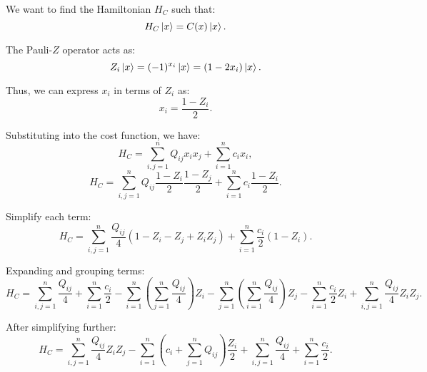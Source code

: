 \documentclass[12pt]{article}
\begin{document}
We want to find the Hamiltonian \( H_C \) such that:
\[
H_C \ket{x} = C(x) \ket{x}.
\]

The Pauli-\( Z \) operator acts as:
\[
Z_i \ket{x} = (-1)^{x_i} \ket{x} = (1 - 2x_i) \ket{x}.
\]

Thus, we can express \( x_i \) in terms of \( Z_i \) as:
\[
x_i = \frac{1 - Z_i}{2}.
\]

Substituting into the cost function, we have:
\[
H_C = \sum_{i,j=1}^n Q_{ij} x_i x_j + \sum_{i=1}^n c_i x_i,
\]
\[
H_C = \sum_{i,j=1}^n Q_{ij} \frac{1 - Z_i}{2} \frac{1 - Z_j}{2} + \sum_{i=1}^n c_i \frac{1 - Z_i}{2}.
\]

Simplify each term:
\[
H_C = \sum_{i,j=1}^n \frac{Q_{ij}}{4} (1 - Z_i - Z_j + Z_i Z_j) + \sum_{i=1}^n \frac{c_i}{2} (1 - Z_i).
\]

Expanding and grouping terms:
\[
H_C = \sum_{i,j=1}^n \frac{Q_{ij}}{4} + \sum_{i=1}^n \frac{c_i}{2} 
- \sum_{i=1}^n \left( \sum_{j=1}^n \frac{Q_{ij}}{4} \right) Z_i 
- \sum_{j=1}^n \left( \sum_{i=1}^n \frac{Q_{ij}}{4} \right) Z_j 
- \sum_{i=1}^n \frac{c_i}{2} Z_i
+ \sum_{i,j=1}^n \frac{Q_{ij}}{4} Z_i Z_j.
\]

After simplifying further:
\[
H_C = \sum_{i,j=1}^n \frac{Q_{ij}}{4} Z_i Z_j 
- \sum_{i=1}^n \left( c_i + \sum_{j=1}^n Q_{ij} \right) \frac{Z_i}{2}
+ \sum_{i,j=1}^n \frac{Q_{ij}}{4} + \sum_{i=1}^n \frac{c_i}{2}.
\]
\end{document}
